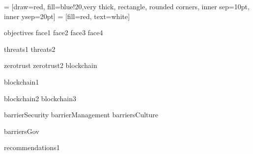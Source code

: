 \documentclass[unknownkeysallowed]{beamer}
\begin{document}

 = [draw=red, fill=blue!20,very thick,
rectangle, rounded corners, inner sep=10pt, inner ysep=20pt]
 = [fill=red, text=white]


\begin{frame}
  \titlepage
\end{frame}

{objectives}
{face1}
{face2}
{face3}
{face4}

{threats1}
{threats2}

{zerotrust}
{zerotrust2}
{blockchain}

{blockchain1}

{blockchain2}
{blockchain3}


{barrierSecurity}
{barrierManagement}
{barriersCulture}

{barriersGov}


{recommendations1}


\begin{frame}[allowframebreaks]

  \printbibliography

\end{frame}


\appendix
\end{document}
